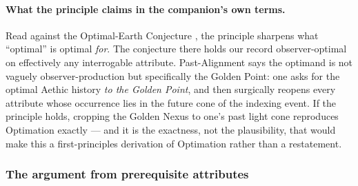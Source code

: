 \paragraph{What the principle claims in the companion's own terms.}\label{gc:rem:oec}
Read against the Optimal-Earth Conjecture \cite{AethusOptimalEarth}, the
principle sharpens what ``optimal'' is optimal \emph{for}. The
conjecture there holds our record observer-optimal on effectively any
interrogable attribute. Past-Alignment says the optimand is not
vaguely observer-production but specifically the Golden Point: one asks
for the optimal Aethic history \emph{to the Golden Point}, and then
surgically reopens every attribute whose occurrence lies in the future
cone of the indexing event. If the principle holds, cropping the Golden
Nexus to one's past light cone reproduces Optimation exactly --- and it
is the exactness, not the plausibility, that would make this a
first-principles derivation of Optimation rather than a restatement.

\subsubsection{The argument from prerequisite attributes}
\label{gc:subsub:pastalign-argument}

